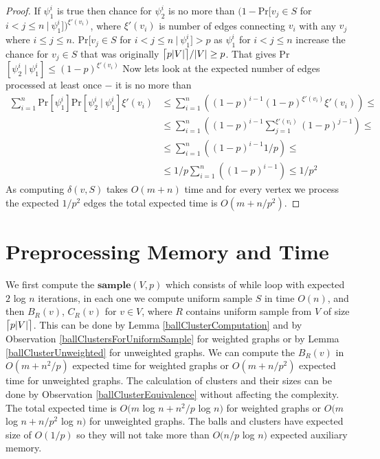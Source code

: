 \documentclass[shortabstract, lic, english]{iithesis}
\theoremstyle{definition} \newtheorem{definition}{Definition}[chapter]
\theoremstyle{plain} \newtheorem{remark}[definition]{Observation}
\theoremstyle{plain} \newtheorem{theorem}[definition]{Theorem}
\theoremstyle{plain} \newtheorem{lemma}[definition]{Lemma}
\theoremstyle{plain} \newtheorem{conjecture}[definition]{Conjecture}
\DeclarePairedDelimiter{\ceil}{\lceil}{\rceil}
\begin{document}
\begin{proof}
    If $\psi_1^i$ is true then chance for $\psi_2^i$ is no more than
    \newline
    $(1 - $Pr$[v_j \in S $ for $i < j \leq n ~|~ \psi_1^i])^{\xi'(v_i)}$, where $\xi'(v_i)$ is number of edges connecting $v_i$ with any $v_j$ where $i \leq j \leq n$.
    \newline
    Pr$[v_j \in S $ for $i < j \leq n ~|~ \psi_1^i] > p$ as $\psi_1^i$ for $i < j \leq n$ increase the chance for $v_j \in S$ that was originally $\ceil[\big]{p  |V|}/|V| \geq p$.
    That gives Pr$[\psi_2^i ~|~ \psi_1^i] \leq (1-p)^{\xi'(v_i)}$
    \newline
    Now lets look at the expected number of edges processed at least once $-$ it is no more than
    \begin{align}
    \sum_{i=1}^{n} \text{Pr}[\psi_1^i]  \text{Pr}[\psi_2^i ~|~ \psi_1^i]  \xi'(v_i) &\leq \sum_{i=1}^{n} ((1-p)^{i-1} (1-p)^{\xi'(v_i)}\xi'(v_i)) \leq \nonumber\\
    &\leq \sum_{i=1}^{n} ((1-p)^{i-1} \sum_{j=1}^{\xi'(v_i)}(1-p)^{j-1}) \leq \nonumber\\
    &\leq \sum_{i=1}^{n} ((1-p)^{i-1}  1/p) \leq \nonumber\\
    &\leq 1/p  \sum_{i=1}^{n} ((1-p)^{i-1}) \leq 1/p^2 \nonumber
    \end{align}
    As computing $\delta(v, S)$ takes $O(m + n)$ time and for every vertex we process the expected $1/p^2$ edges the total expected time is $O(m + n/p^2)$.
\end{proof}


\section{Preprocessing Memory and Time}

We first compute the $\mathbf{sample}(V, p)$ which consists of while loop with expected $2$ log $n$ iterations,
in each one we compute uniform sample $S$ in time $O(n)$, and then $B_R(v)$, $C_R(v)$ for $v \in V$, where $R$ contains uniform sample from $V$ of size $\ceil[\big]{p  |V|}$.
This can be done by Lemma \ref{ballClusterComputation} and by Observation \ref{ballClustersForUniformSample} for weighted graphs or by Lemma \ref{ballClusterUnweighted} for unweighted graphs.
We can compute the $B_R(v)$ in $O(m + n^2/p)$ expected time for weighted graphs or $O(m + n/p^2)$ expected time for unweighted graphs.
The calculation of clusters and their sizes can be done by Observation \ref{ballClusterEquivalence} without affecting the complexity.
The total expected time is $O(m $ log $ n + n^2/p $ log $ n)$ for weighted graphs or $O(m $ log $ n + n/p^2 $ log $ n)$ for unweighted graphs.
The balls and clusters have expected size of $O(1/p)$ so they will not take more than $O(n/p $ log $ n)$ expected auxiliary memory.
\end{document}
